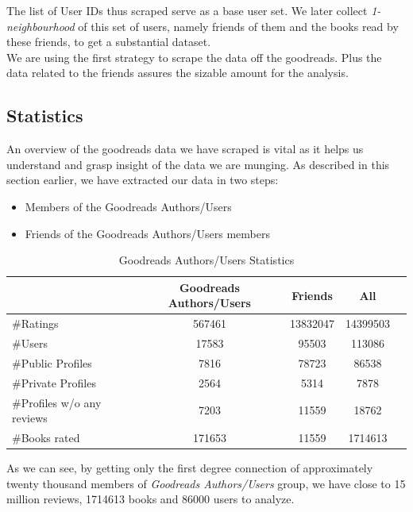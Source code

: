 \documentclass[11pt]{article}
\begin{document}
The list of User IDs thus scraped serve as a base user set. We later collect {\it 1-neighbourhood} of this set of users, namely friends of them and the books read by these friends, to get a substantial dataset.\\
We are using the first strategy to scrape the data off the goodreads. Plus the data related to the friends assures the sizable amount for the analysis.

\subsection{Statistics}

An overview of the goodreads data we have scraped is vital as it helps us understand and grasp insight of the data we are munging.
As described in this section earlier, we have extracted our data in two steps:
\begin{itemize}
\item Members of the Goodreads Authors/Users
\item Friends of the Goodreads Authors/Users members
\end{itemize}

\begin{table}[ht]
\begin{center}
\begin{tabular}{lcccc}
\hline
                           &  Goodreads Authors/Users    &   Friends                &   All        \\ \hline
\#Ratings                  &  567461                     &   13832047               &   14399503  \\ \hline
\#Users                    &  17583                      &   95503                  &   113086     \\ \hline
\#Public Profiles          &  7816                       &   78723                  &   86538     \\ \hline
\#Private Profiles         &  2564                       &   5314                   &   7878      \\ \hline
\#Profiles w/o any reviews &  7203                       &   11559                  &   18762      \\ \hline
\#Books rated              &  171653                     &   11559                  &   1714613      \\ \hline
\end{tabular}
\end{center}
\caption{Goodreads Authors/Users Statistics} \label{table:crawl_stat}
\end{table}
As we can see, by getting only the first degree connection of approximately twenty thousand members of {\it Goodreads Authors/Users} group, we have close to 15 million reviews, 1714613 books and 86000 users to analyze.
\end{document}
